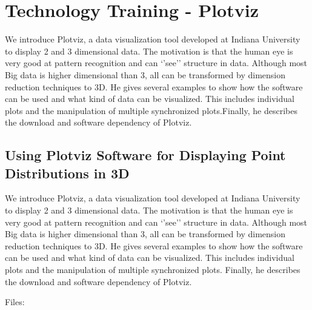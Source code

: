 

\chapter{Technology Training - Plotviz}\label{technology-training---plotviz}

\FILENAME

We introduce Plotviz, a data visualization tool developed at Indiana
University to display 2 and 3 dimensional data. The motivation is that
the human eye is very good at pattern recognition and can `'see''
structure in data. Although most Big data is higher dimensional than 3,
all can be transformed by dimension reduction techniques to 3D. He gives
several examples to show how the software can be used and what kind of
data can be visualized. This includes individual plots and the
manipulation of multiple synchronized plots.Finally, he describes the
download and software dependency of Plotviz.

\section{Using Plotviz Software for Displaying Point Distributions in
3D}\label{using-plotviz-software-for-displaying-point-distributions-in-3d}

We introduce Plotviz, a data visualization tool developed at Indiana
University to display 2 and 3 dimensional data. The motivation is that
the human eye is very good at pattern recognition and can `'see''
structure in data. Although most Big data is higher dimensional than 3,
all can be transformed by dimension reduction techniques to 3D. He gives
several examples to show how the software can be used and what kind of
data can be visualized. This includes individual plots and the
manipulation of multiple synchronized plots. Finally, he describes the
download and software dependency of Plotviz.


Files:




